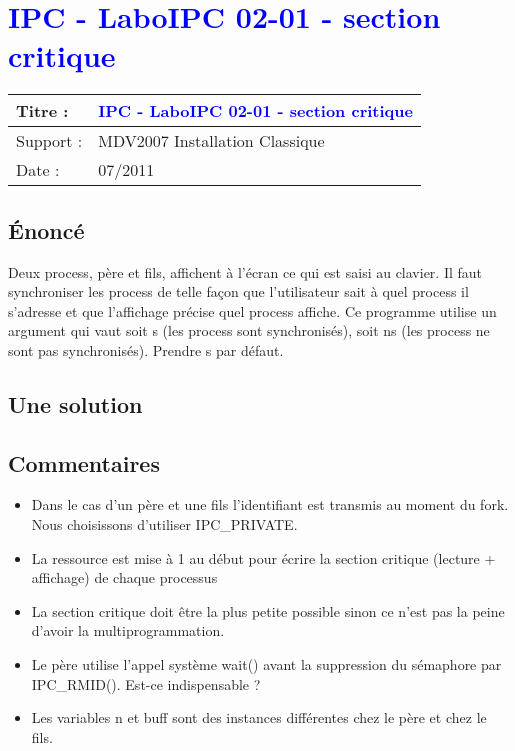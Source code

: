 \lstset{language=c}
\renewcommand{\titre}{\textcolor{blue}{ IPC - LaboIPC 02-01 - section critique }}

\lhead{ \titre }
\section{{\titre} }

\begin{tabular}{|l|l|}
\hline
Titre : 	& \titre \\\hline
Support : 	& MDV2007 Installation Classique \\\hline
Date :		& 07/2011 \\\hline
\end{tabular}

\subsection{Énoncé}

Deux process, père et fils, affichent à l'écran ce qui est saisi au clavier. Il faut synchroniser les process de telle façon que l'utilisateur sait à quel process il s'adresse et que l'affichage précise quel process affiche. Ce programme utilise un argument qui vaut soit s (les process sont synchronisés), soit ns (les process ne sont pas synchronisés). Prendre s par défaut.

\subsection{Une solution}



\subsection{Commentaires}

\begin{itemize}
\item Dans le cas d'un père et une fils l'identifiant est transmis  au moment du fork. Nous choisissons d'utiliser IPC\_PRIVATE.
\item La ressource est mise à 1 au début pour écrire la section critique (lecture + affichage) de chaque processus
\item La section critique doit être la plus petite possible sinon ce n'est pas la peine d'avoir la multiprogrammation.
\item Le père utilise l'appel système wait() avant la suppression du sémaphore par IPC\_RMID(). Est-ce indispensable ?
\item Les variables n et buff sont des instances différentes chez le père et chez le fils.
\end{itemize}

